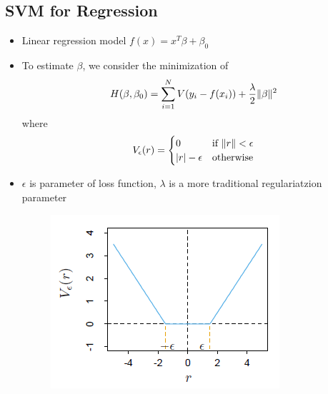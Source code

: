 \subsection*{SVM for Regression}
\begin{itemize}
    \item
        Linear regression model $f(x) = x^T \beta + \beta_0$
    \item
        To estimate $\beta$, we consider the minimization of
        $$H(\beta, \beta_0) = \sum_{i=1}^N V(y_i - f(x_i)) + \frac{\displaystyle \lambda}{\displaystyle 2} \lVert\beta\rVert^2$$
        where 
        \[ V_{\epsilon}(r)=
        \begin{cases}
            0 & \text{if } \lVert r\rVert < \epsilon\\
            |r| - \epsilon &\text{otherwise}
        \end{cases}
        \]
    \item
        $\epsilon$ is parameter of loss function, $\lambda$ is a more traditional regulariatzion parameter
    \begin{figure}[H]
        \centering
        \includegraphics[scale=1]{figures/svm_regression}
    \end{figure}
\end{itemize}

